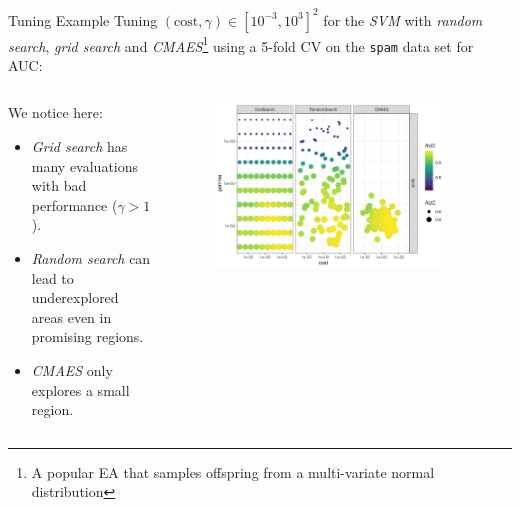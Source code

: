 \begin{frame}{Tuning Example}
Tuning $(\text{cost},\gamma) \in [10^{-3},10^{3}]^2$ for the \emph{SVM} with \emph{random search}, \emph{grid search} and \emph{CMAES}\footnote{A popular EA that samples offspring from a multi-variate normal distribution} using a 5-fold CV on the \texttt{spam} data set for AUC:
\begin{columns}
\begin{column}{0.45\textwidth}
  \vspace{1em}

  We notice here:

  \begin{itemize}
    \item \emph{Grid search} has many evaluations with bad performance ($\gamma>1$).
    \item \emph{Random search} can lead to underexplored areas even in promising regions.
    \item \emph{CMAES} only explores a small region.
  \end{itemize}
\end{column}%
\begin{column}{0.5\textwidth}
  \vspace{-1em}
  \begin{figure}
  \includegraphics[width=0.9\textwidth]{images/benchmark_scatter.png}
  \end{figure}
\end{column}
\end{columns}
\end{frame}

